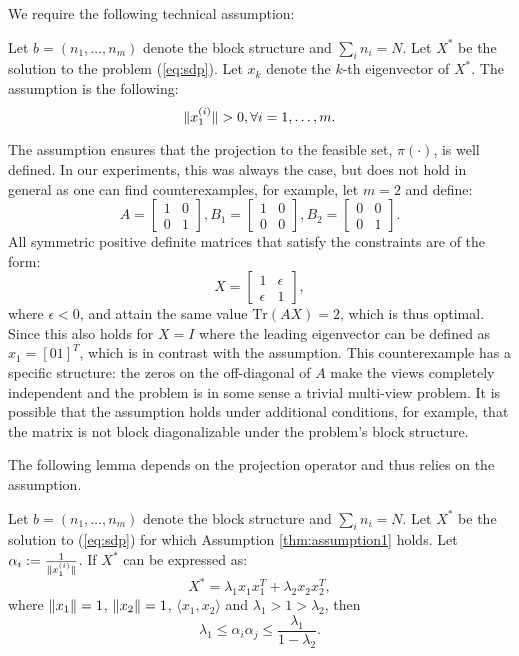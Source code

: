 We require the following technical assumption:
\begin{assumption}\label{thm:assumption1}
Let $b = \left(n_1,\ldots,n_m\right)$ denote the block structure and $ \sum_i n_i = N $.
Let $X^*$ be the solution to the problem (\ref{eq:sdp}). Let $x_k$ denote the $k$-th
eigenvector of $X^*$. The assumption is the following:
$$\lVert x_1^{(i)}\rVert > 0, \forall i = 1,\ldots, m.$$
\end{assumption}

\begin{remark} The assumption ensures that the projection to the feasible set,
$\pi(\cdot)$, is well defined. In our experiments, this was always
the case, but does not hold in general as one can find counterexamples, for example, let $m = 2$ and define:
$$
A = \begin{bmatrix}
  1 & 0 \\
  0 & 1
 \end{bmatrix},
B_1 = \begin{bmatrix}
  1 & 0 \\
  0 & 0
 \end{bmatrix},
B_2 = \begin{bmatrix}
  0 & 0 \\
  0 & 1
 \end{bmatrix}.
$$
All symmetric positive definite matrices that satisfy the constraints are of the form:
$$
X = \begin{bmatrix}
  1 & \epsilon \\
  \epsilon & 1
  \end{bmatrix},
$$ where $\epsilon < 0$, and attain the same value $\mathrm{Tr}\left(A X \right) = 2$, which is thus optimal.
Since this also holds for $X = I$ where the leading eigenvector can be defined as $x_1 = [0 1]^T$, which is in
contrast with the assumption. This counterexample has a specific structure: the zeros on the off-diagonal of $A$
make the views completely independent and the problem is in some sense a trivial multi-view problem.
It is possible that the assumption holds under additional conditions, for example, that the
matrix is not block diagonalizable under the problem's block structure.

\end{remark}


The following lemma depends on the projection
operator and thus relies on the assumption.

\begin{lemma}
Let $b = \left(n_1,\ldots,n_m\right)$ denote the block structure and $ \sum_i n_i = N $.
Let $X^*$ be the solution to (\ref{eq:sdp}) for which Assumption \ref{thm:assumption1} holds.
Let $\alpha_i := \frac{1}{\lVert x_1^{(i)}\rVert}$.
If $X^*$ can be expressed as:
$$X^* = \lambda_1  x_1 x_1^T + \lambda_2 x_2 x_2^T,$$
where $\lVert x_1\rVert=1$, $\lVert x_2\rVert=1$, $\langle x_1, x_2 \rangle$ and $\lambda_1 > 1 >  \lambda_2$, then
$$\lambda_1 \leq \alpha_i \alpha_j  \leq \frac{\lambda_1}{1 - \lambda_2}.$$
\end{lemma}

